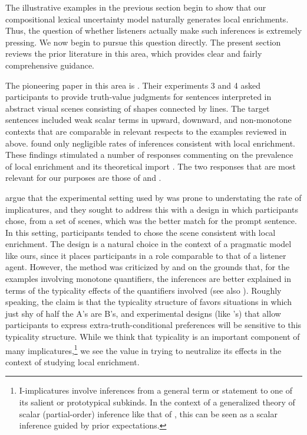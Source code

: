 \documentclass[leqno,12pt]{article}
\begin{document}
The illustrative examples in the previous section begin to show that
our compositional lexical uncertainty model naturally generates local
enrichments. Thus, the question of whether listeners actually make
such inferences is extremely pressing. We now begin to pursue this
question directly. The present section reviews the prior literature in
this area, which provides clear and fairly comprehensive guidance.

The pioneering paper in this area is
\citealt{Geurts:Pouscoulous:2009}. Their experiments 3 and 4 asked
participants to provide truth-value judgments for sentences
interpreted in abstract visual scenes consisting of shapes connected
by lines. The target sentences included weak scalar terms in upward,
downward, and non-monotone contexts that are comparable in relevant
respects to the examples reviewed in  above.
\citeauthor{Geurts:Pouscoulous:2009} found only negligible rates of
inferences consistent with local enrichment. These findings stimulated
a number of responses commenting on the prevalence of local enrichment
and its theoretical import \citep{Ippolito:2010,Sauerland:2010}. The
two responses that are most relevant for our purposes are those of
\citet{Clifton:Dube:2010} and \citet{Chemla:Spector:2011}.

\citet{Clifton:Dube:2010} argue that the experimental setting used by
\citeauthor{Geurts:Pouscoulous:2009} was prone to understating the
rate of implicatures, and they sought to address this with a design in
which participants chose, from a set of scenes, which was the better
match for the prompt sentence. In this setting, participants tended to
chose the scene consistent with local enrichment. The design is a
natural choice in the context of a pragmatic model like ours, since it
places participants in a role comparable to that of a listener
agent. However, the method was criticized by
 and \citet{vanTiel:2014} on
the grounds that, for the examples involving monotone quantifiers, the
inferences are better explained in terms of the typicality effects of
the quantifiers involved (see also \citealt{Degen:Tanenhaus:2014}).
Roughly speaking, the claim is that the typicality structure of
 favors situations in which just shy of half the
A's are B's, and experimental designs (like
\citeauthor{Clifton:Dube:2010}'s) that allow participants to express
extra-truth-conditional preferences will be sensitive to this
typicality structure. While we think that typicality is an important
component of many implicatures,\footnote{
  I-implicatures involve inferences from a general term or statement
  to one of its salient or prototypical subkinds. In the context of a
  generalized theory of scalar (partial-order) inference like that of
  \citet{Hirschberg85}, this can be seen as a scalar inference guided
  by prior expectations.} we see the value in trying to neutralize its
effects in the context of studying local enrichment.
\end{document}
